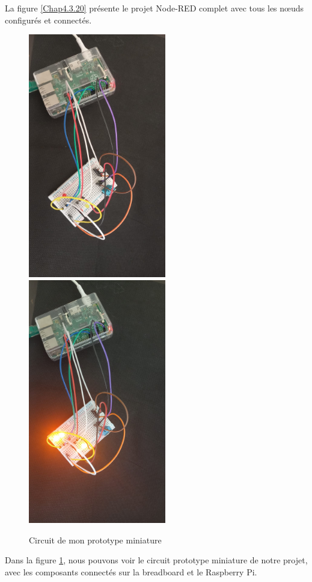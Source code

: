 La figure \ref{Chap4.3.20} présente le projet Node-RED complet avec tous les nœuds configurés et connectés.

\begin{figure}[H]
\centering
\includegraphics[width=6cm]{Images/Node-11.jpg} \includegraphics[width=6cm]{Images/Node-12.jpg}

\caption{Circuit de mon prototype miniature}
\label{Chap4.3.21}
\end{figure}

Dans la figure \ref{Chap4.3.21}, nous pouvons voir le circuit prototype miniature de notre projet, avec les composants connectés sur la breadboard et le Raspberry Pi.

